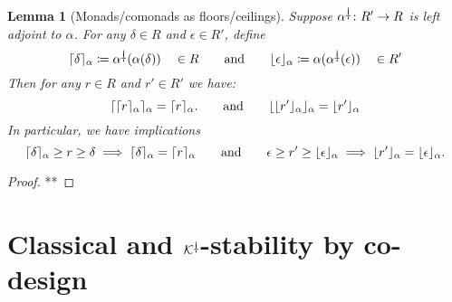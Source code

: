 \documentclass[11pt, one side, article]{memoir}
\theoremstyle{definition}
\theoremstyle{plain}
\newtheorem{lemma}[definitionx]{Lemma}
\DeclarePairedDelimiter{\floor}{\lfloor}{\rfloor}
\DeclarePairedDelimiter{\ceil}{\lceil}{\rceil}
\newcommand{\cat}[1]{\mathcal{#1}}%
\newcommand{\ldag}{^{\rotatebox{180}{$\dagger$}}}
\newcommand{\blank}[1][1pt]{\vspace{#1}\cdot\vspace{#1}}
\newcommand{\qqand}{\qquad\text{and}\qquad}
\newcommand{\K}{\cat{K}}
\newcommand{\Kdag}[1][0]{\K\ldag}
\newcommand{\flr}[2][\blank]{\floor{#1}_{#2}}
\newcommand{\clg}[2][\blank]{\ceil{#1}_{#2}}
\begin{document}
\begin{lemma}[Monads/comonads as floors/ceilings]
Suppose $\alpha\ldag\colon R'\to R$ is left adjoint to $\alpha$. For any $\delta\in R$ and $\epsilon\in R'$, define
\[
	\clg[\delta]{\alpha}\coloneqq\alpha\ldag(\alpha(\delta))\quad\in R
	\qqand
	\flr[\epsilon]{\alpha}\coloneqq\alpha(\alpha\ldag(\epsilon))\quad\in R'
\]
 Then for any $r\in R$ and $r'\in R'$ we have:
\[
  \clg[{\clg[r]{\alpha}}]{\alpha}=\clg[r]{\alpha}.
  \qqand
  \flr[{\flr[r']{\alpha}}]{\alpha}=\flr[r']{\alpha}
\]
In particular, we have implications
 \[
 	\clg[\delta]{\alpha}\geq r\geq\delta
	\implies
 	\clg[\delta]{\alpha}
	=
	\clg[r]{\alpha}	
	\qqand
 	\epsilon\geq r'\geq\flr[\epsilon]{\alpha}
	\implies
	\flr[r']{\alpha}
	=
 	\flr[\epsilon]{\alpha}
	.\]
\end{lemma}
\begin{proof}
**
\end{proof}


\chapter{Classical and $\Kdag$-stability by co-design}
\label{}
\end{document}
